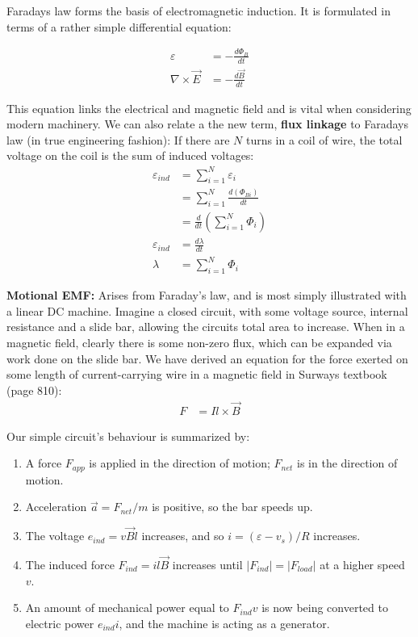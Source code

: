 \documentclass{book}
\begin{document}
 Faradays law forms the basis of electromagnetic induction. It is formulated in terms of a rather simple differential equation:
 
 \begin{align*}
 	\varepsilon &= - \frac{d\Phi_B}{dt}  \\
 	\nabla \times \vec{E} &= - \frac{d\vec{B}}{dt}
 \end{align*}
 
 This equation links the electrical and magnetic field and is vital when considering modern machinery. We can also relate a the new term, \textbf{flux linkage} to Faradays law (in true engineering fashion): If there are $N$ turns in a coil of wire, the total voltage on the coil is the sum of induced voltages:
 \begin{align*}
 	\varepsilon_{ind} &= \sum_{i=1}^N \varepsilon_i \\
 	&= \sum_{i=1}^N \frac{d (\Phi_{Bi})}{dt} \\
 	&= \frac{d}{dt} (\sum_{i=1} ^N \Phi_i) \\
 	\varepsilon_{ind} &= \frac{d \lambda}{dt} \\
 	\lambda &= \sum_{i=1}^{N} \Phi_i 
 \end{align*}
 
 \textbf{Motional EMF:} Arises from Faraday's law, and is most simply illustrated with a linear DC machine. Imagine a closed circuit, with some voltage source, internal resistance and a slide bar, allowing the circuits total area to increase. When in a magnetic field, clearly there is some non-zero flux, which can be expanded via work done on the slide bar. We have derived an equation for the force exerted on some length of current-carrying wire in a magnetic field in Surways textbook (page 810):
 \begin{align*}
 	F &= I l\times \vec{B}
 \end{align*}
 
 Our simple circuit's behaviour is summarized by:
 
 \begin{enumerate}
 	\item A force $F_{app}$ is applied in the direction of motion; $F_{net}$ is in the direction of motion.
 	\item Acceleration $\vec{a} = 	F_{net} / m $ is positive, so the bar speeds up.
 	\item The voltage $e_{ind} = v \vec{B}l$ increases, and so $i= (\varepsilon - v_s) / R$ increases. 
 	\item The induced force $F_{ind} = i l\vec{B}$ increases until $|F_{ind}| = |F_{load}|$ at a higher speed $v$.
 	\item An amount of mechanical power equal to $F_{ind}v$ is now being converted to electric power $e_{ind}i$, and the machine is acting as a generator. 
 \end{enumerate}
\end{document}
